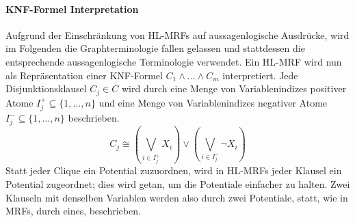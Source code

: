 \paragraph{KNF-Formel Interpretation}
Aufgrund der Einschränkung von HL-MRFs auf aussagenlogische Ausdrücke, wird im Folgenden die Graphterminologie fallen gelassen und stattdessen die entsprechende aussagen\-logische Terminologie verwendet.
Ein HL-MRF wird nun als Repräsentation einer KNF-Formel $C_1 \land \dots \land C_m$ interpretiert.
Jede Disjunktionsklausel $C_j \in C$ wird durch eine Menge von Variablenindizes positiver Atome $I^{+}_j \subseteq \{1,\dots,n\}$ und eine Menge von Variablenindizes negativer Atome $I^{-}_j \subseteq \{1,\dots,n\}$ beschrieben.
\[
	C_j \cong \left(\bigvee_{i \in I^{+}_j} X_i\right) \lor \left(\bigvee_{i \in I^{-}_j} \lnot X_i\right)
\]
Statt jeder Clique ein Potential zuzuordnen, wird in HL-MRFs jeder Klausel ein Potential zugeordnet;
dies wird getan, um die Potentiale einfacher zu halten.
Zwei Klauseln mit denselben Variablen werden also durch zwei Potentiale, statt, wie in MRFs, durch eines, beschrieben.

